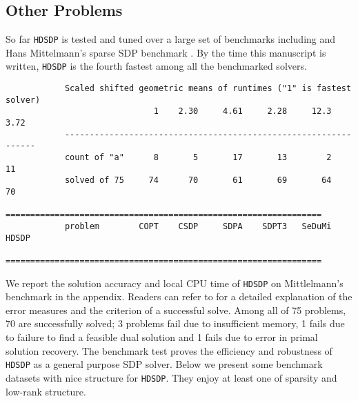 \subsection{Other Problems}

So far {{\texttt{HDSDP}}} is tested and tuned over a large set of benchmarks
including  {\cite{borchers1999sdplib}} and Hans
Mittelmann's sparse SDP benchmark {\cite{mittelmann2003independent}}. By the time this manuscript is written, {{\texttt{HDSDP}}} is the fourth fastest among all the benchmarked solvers.
\begin{center}
\begin{lstlisting}
			Scaled shifted geometric means of runtimes ("1" is fastest solver)
            			      1    2.30     4.61     2.28     12.3     3.72
			----------------------------------------------------------------
			count of "a"      8       5       17       13        2       11
			solved of 75     74      70       61       69       64       70
			================================================================
			problem        COPT    CSDP     SDPA    SDPT3   SeDuMi    HDSDP
			================================================================
\end{lstlisting}	
\end{center}

We report the solution accuracy and local CPU time of {{\texttt{HDSDP}}} on
Mittlelmann's benchmark in the appendix. Readers can refer to
{\cite{mittelmann2003independent}} for a detailed explanation of the error
measures and the criterion of a successful solve. Among all of 75 problems, 70
are successfully solved; 3 problems fail due to insufficient memory, 1 fails due to failure to 
find a feasible dual solution and 1 fails
 due to error in primal solution recovery. The benchmark test proves the
efficiency and robustness of {{\texttt{HDSDP}}} as a general purpose SDP
solver. Below we present some benchmark datasets with nice structure
for {{\texttt{HDSDP}}}. They enjoy at least one of sparsity and low-rank
structure.

